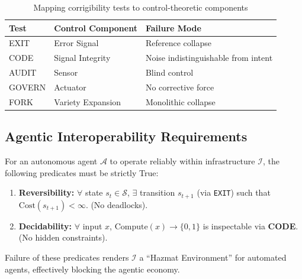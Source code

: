 \documentclass{article}
\begin{document}
\begin{table}[htbp]
\centering
\caption{Mapping corrigibility tests to control-theoretic components}
\label{tab:control-mapping}
\begin{tabular}{lll}
\hline
\textbf{Test} & \textbf{Control Component} & \textbf{Failure Mode} \\
\hline
EXIT & Error Signal & Reference collapse \\
CODE & Signal Integrity & Noise indistinguishable from intent \\
AUDIT & Sensor & Blind control \\
GOVERN & Actuator & No corrective force \\
FORK & Variety Expansion & Monolithic collapse \\
\hline
\end{tabular}
\end{table}

\subsection{Agentic Interoperability Requirements}

For an autonomous agent $\mathcal{A}$ to operate reliably within infrastructure $\mathcal{I}$, the following predicates must be strictly True:

\begin{enumerate}
    \item \textbf{Reversibility:} $\forall$ state $s_t \in \mathcal{S}$, $\exists$ transition $s_{t+1}$ (via \texttt{EXIT}) such that $\text{Cost}(s_{t+1}) < \infty$. (No deadlocks).
    \item \textbf{Decidability:} $\forall$ input $x$, $\text{Compute}(x) \to \{0,1\}$ is inspectable via \textbf{CODE}. (No hidden constraints).
\end{enumerate}

Failure of these predicates renders $\mathcal{I}$ a ``Hazmat Environment'' for automated agents, effectively blocking the agentic economy.
\end{document}
